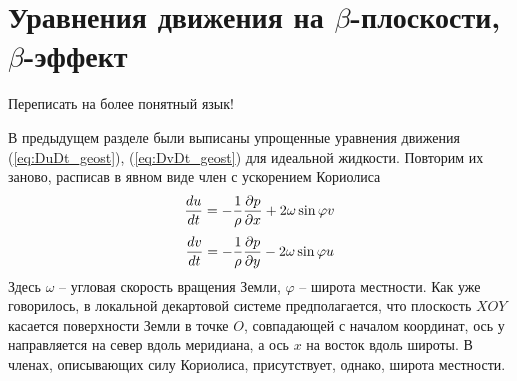 \section{{\color{done}Уравнения движения на $\beta$-плоскости, $\beta$-эффект}}
    \begin{warn}
        Переписать на более понятный язык!
    \end{warn}
    В предыдущем разделе были выписаны упрощенные уравнения движения (\ref{eq:DuDt_geost}), (\ref{eq:DvDt_geost}) для идеальной жидкости. Повторим их заново, расписав в явном виде член с ускорением Кориолиса
    \begin{equation}
    \label{DuDt_geost_cor}
        \displaystyle\frac{d u}{d t} = -\frac{1}{\rho}\displaystyle\frac{\partial p}{\partial x}+2\omega \sin\varphi v
    \end{equation} 
    \begin{equation}
    \label{DvDt_geost_cor}
        \displaystyle\frac{d v}{d t} = -\frac{1}{\rho}\displaystyle\frac{\partial p}{\partial y}-2\omega \sin\varphi u
    \end{equation} 
    Здесь $\omega$ -- угловая скорость вращения Земли, $\varphi$ -- широта местности.  Как уже говорилось, в локальной декартовой системе предполагается, что плоскость $XOY$ касается поверхности Земли в точке $O$, совпадающей с началом координат, ось $у$ направляется на север вдоль меридиана, а ось $x$ на восток вдоль широты. В членах, описывающих силу Кориолиса, присутствует, однако, широта местности.
    
